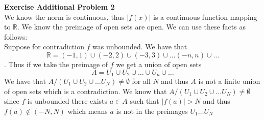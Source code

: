 \documentclass[12pt]{article}
\newenvironment{ques}[1]{\textbf{Exercise #1}\vspace{1 mm}\\ }{\bigskip}
\theoremstyle{definition}
\newcommand{\R}{\mathbb R}
\begin{document}
\begin{ques}{Additional Problem 2}
	We know the norm is continuous, thus $|f(x)|$ is a continuous function
	mapping to $\R$. We know the preimage of open sets are open. We can use
	these facts as follows: \\
	Suppose for contradiction $f$ was unbounded. We have that 
	$$\R = (-1,1) \cup (-2,2) \cup (-3,3) \cup \dots (-n,n) \cup \dots$$.
	Thus if we take the preimage of $f$ we get a union of open sets
	$$A = U_1 \cup U_2 \cup \dots \cup U_n \cup \dots $$
	We have that $A/(U_1 \cup U_2 \cup \dots U_N) \neq \emptyset $ for all $N$
	and thus $A$ is not a finite union of open sets which is a contradiction.
	We know that $A/(U_1 \cup U_2 \cup \dots U_N) \neq \emptyset $ since $f$ is
	unbounded there exists $a \in A$ such that $|f(a)| > N$ and thus $f(a)
	\notin (-N, N)$ which means $a$ is not in the preimages $U_1 \dots U_N$
\end{ques}
\end{document}
